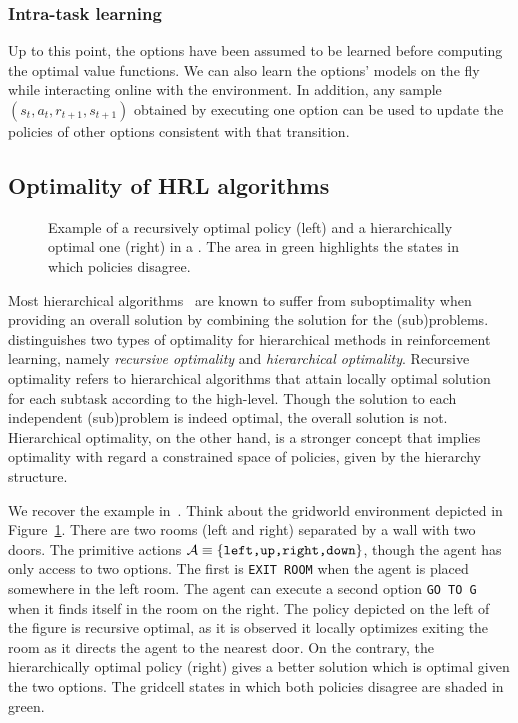 \subsubsection{Intra-task learning}
Up to this point, the options have been assumed to be learned before computing the optimal value functions. We can also learn the options' models on the fly while interacting online with the environment. In addition, any sample $(s_t, a_t, r_{t+1}, s_{t+1})$ obtained by executing one option can be used to update the policies of other options consistent with that transition.

\subsection{Optimality of HRL algorithms}
 
\begin{figure}
  \centering
  
  \hspace{25pt}
  
  \caption{Example of a recursively optimal policy (left) and a hierarchically optimal one (right) in a . The area in green highlights the states in which policies disagree.}
  \label{fig:hrl_optimality}
\end{figure}


Most hierarchical algorithms~\citep{Dietterich2000,Parr1997} are known to suffer from suboptimality when providing an overall solution by combining the solution for the (sub)problems. \citet{Dietterich2000} distinguishes two types of optimality for hierarchical methods in reinforcement learning, namely \textit{recursive optimality} and \textit{hierarchical optimality}. Recursive optimality refers to hierarchical algorithms that attain locally optimal solution for each subtask according to the high-level. Though the solution to each independent (sub)problem is indeed optimal, the overall solution is not. Hierarchical optimality, on the other hand, is a stronger concept that implies optimality with regard a constrained space of policies, given by the hierarchy structure.

\begin{example}[Example 2] We recover the example in~\citep{Dietterich2000}. Think about the gridworld environment depicted in Figure~\ref{fig:hrl_optimality}. There are two rooms (left and right) separated by a wall with two doors. The primitive actions $\mathcal{A}\equiv\{\text{\texttt{left,up,right,down}}\}$, though the agent has only access to two options. The first is \texttt{EXIT ROOM} when the agent is placed somewhere in the left room. The agent can execute a second option \texttt{GO TO G} when it finds itself in the room on the right. The policy depicted on the left of the figure is recursive optimal, as it is observed it locally optimizes exiting the room as it directs the agent to the nearest door. On the contrary, the hierarchically optimal policy (right) gives a better solution which is optimal given the two options. The gridcell states in which both policies disagree are shaded in green.
\end{example}
